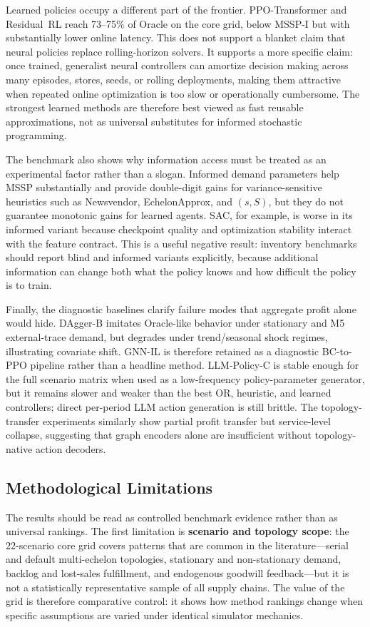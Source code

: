 \documentclass[10pt,a4paper]{article}
\begin{document}
Learned policies occupy a different part of the frontier. PPO-Transformer
and Residual~RL reach 73--75\% of Oracle on the core
grid, below MSSP-I but with substantially lower online latency. This
does not support a blanket claim that neural policies replace
rolling-horizon solvers. It supports a more specific claim: once trained,
generalist neural controllers can amortize decision making across many
episodes, stores, seeds, or rolling deployments, making them attractive
when repeated online optimization is too slow or operationally
cumbersome. The strongest learned methods are therefore best viewed as
fast reusable approximations, not as universal substitutes for informed
stochastic programming.

The benchmark also shows why information access must be treated as an
experimental factor rather than a slogan. Informed demand parameters
help MSSP substantially and provide double-digit gains for
variance-sensitive heuristics such as Newsvendor, EchelonApprox, and
$(s,S)$, but they do not guarantee monotonic gains for learned agents.
SAC, for example, is worse in its informed variant because checkpoint
quality and optimization stability interact with the feature contract.
This is a useful negative result: inventory benchmarks should report
blind and informed variants explicitly, because additional information
can change both what the policy knows and how difficult the policy is to
train.

Finally, the diagnostic baselines clarify failure modes that aggregate
profit alone would hide. DAgger-B imitates Oracle-like behavior under
stationary and M5 external-trace demand, but degrades under
trend/seasonal shock regimes, illustrating covariate shift. GNN-IL is
therefore retained as a diagnostic BC-to-PPO pipeline rather than a
headline method. LLM-Policy-C is stable enough for the full scenario
matrix when used as a low-frequency policy-parameter generator, but it
remains slower and weaker than the best OR, heuristic, and learned
controllers; direct per-period LLM action generation is still brittle.
The topology-transfer experiments similarly show partial profit
transfer but service-level collapse, suggesting that graph encoders
alone are insufficient without topology-native action decoders.

\subsection{Methodological Limitations}

The results should be read as controlled benchmark evidence rather than
as universal rankings. The first limitation is \textbf{scenario and
topology scope}: the 22-scenario core grid covers patterns that are
common in the literature---serial and default multi-echelon topologies,
stationary and non-stationary demand, backlog and lost-sales fulfillment,
and endogenous goodwill feedback---but it is not a statistically
representative sample of all supply chains. The value of the grid is
therefore comparative control: it shows how method rankings change when
specific assumptions are varied under identical simulator mechanics.
\end{document}

